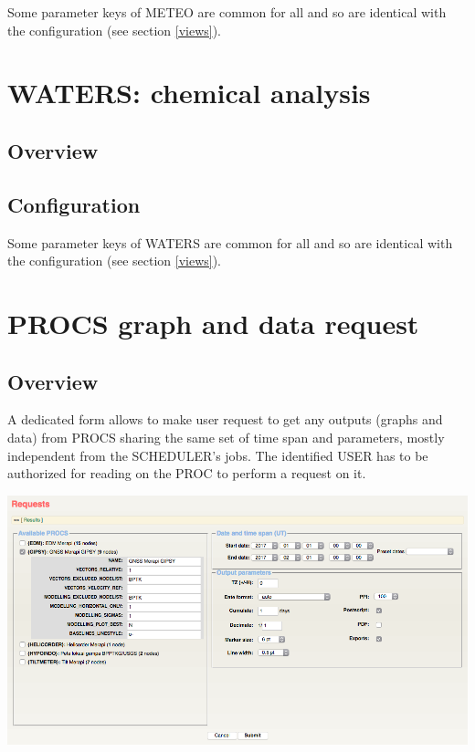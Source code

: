 Some parameter keys of METEO are common for all  and  so are identical with the  configuration (see section \ref{views}).




\section{WATERS: chemical analysis}

\subsection{Overview}

\subsection{Configuration}

Some parameter keys of WATERS are common for all  and  so are identical with the  configuration (see section \ref{views}).





\section{PROCS graph and data request}

\subsection{Overview}

A dedicated form  allows to make user request to get any outputs (graphs and data) from PROCS sharing the same set of time span and parameters, mostly independent from the SCHEDULER's jobs. The identified USER has to be authorized for reading on the PROC to perform a request on it.

\includegraphics[width=\textwidth]{figures/formREQ.png}

